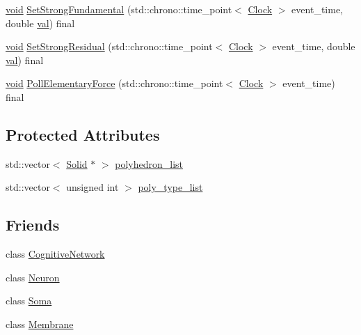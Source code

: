 \begin{DoxyCompactItemize}
\item 
\mbox{\hyperlink{glad_8h_a950fc91edb4504f62f1c577bf4727c29}{void}} \mbox{\hyperlink{class_solid_a4342786a7785b1a3816d20de02105bcf}{Set\+Strong\+Fundamental}} (std\+::chrono\+::time\+\_\+point$<$ \mbox{\hyperlink{universe_8h_a0ef8d951d1ca5ab3cfaf7ab4c7a6fd80}{Clock}} $>$ event\+\_\+time, double \mbox{\hyperlink{glad_8h_a26942fd2ed566ef553eae82d2c109c8f}{val}}) final
\item 
\mbox{\hyperlink{glad_8h_a950fc91edb4504f62f1c577bf4727c29}{void}} \mbox{\hyperlink{class_solid_a8b80ebe209fcd3afa4791968127753d0}{Set\+Strong\+Residual}} (std\+::chrono\+::time\+\_\+point$<$ \mbox{\hyperlink{universe_8h_a0ef8d951d1ca5ab3cfaf7ab4c7a6fd80}{Clock}} $>$ event\+\_\+time, double \mbox{\hyperlink{glad_8h_a26942fd2ed566ef553eae82d2c109c8f}{val}}) final
\item 
\mbox{\hyperlink{glad_8h_a950fc91edb4504f62f1c577bf4727c29}{void}} \mbox{\hyperlink{class_solid_ae2a486e59f11f96a1a39756b3f3da53f}{Poll\+Elementary\+Force}} (std\+::chrono\+::time\+\_\+point$<$ \mbox{\hyperlink{universe_8h_a0ef8d951d1ca5ab3cfaf7ab4c7a6fd80}{Clock}} $>$ event\+\_\+time) final
\end{DoxyCompactItemize}
\subsection*{Protected Attributes}
\begin{DoxyCompactItemize}
\item 
std\+::vector$<$ \mbox{\hyperlink{class_solid}{Solid}} $\ast$ $>$ \mbox{\hyperlink{class_solid_a67ef5cdd87e5629159660fa9bb5833c8}{polyhedron\+\_\+list}}
\item 
std\+::vector$<$ unsigned int $>$ \mbox{\hyperlink{class_solid_ad63206ff20f38b621db482b01801c4c5}{poly\+\_\+type\+\_\+list}}
\end{DoxyCompactItemize}
\subsection*{Friends}
\begin{DoxyCompactItemize}
\item 
class \mbox{\hyperlink{class_solid_ad04bbaef84caa0d408ec09a1c1302f5f}{Cognitive\+Network}}
\item 
class \mbox{\hyperlink{class_solid_aa410d74ba34b18a9f6bdf24323c4ee5b}{Neuron}}
\item 
class \mbox{\hyperlink{class_solid_aaa07b7b364b620b9a781f30a5cd9f5ea}{Soma}}
\item 
class \mbox{\hyperlink{class_solid_ac790db405644a01723104c3c0c8128bb}{Membrane}}
\end{DoxyCompactItemize}
